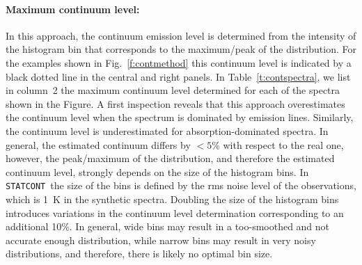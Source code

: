 \documentclass{aa}
\newcommand{\statcont} {\texttt{STATCONT}}
\begin{document}
\paragraph{\textbf{Maximum continuum level}:}
In this approach, the continuum emission level is determined from the intensity of the histogram bin that corresponds to the maximum/peak of the distribution. For the examples shown in Fig.~\ref{f:contmethod} this continuum level is indicated by a black dotted line in the central and right panels. In Table~\ref{t:contspectra}, we list in column~2 the maximum continuum level determined for each of the spectra shown in the Figure. A first inspection reveals that this approach overestimates the continuum level when the spectrum is dominated by emission lines. Similarly, the continuum level is underestimated for absorption-dominated spectra. In general, the estimated continuum differs by $<5$\% with respect to the real one, however, the peak/maximum of the distribution, and therefore the estimated continuum level, strongly depends on the size of the histogram bins. In \statcont\ the size of the bins is defined by the rms noise level of the observations, which is 1~K in the synthetic spectra. Doubling the size of the histogram bins introduces variations in the continuum level determination corresponding to an additional 10\%. In general, wide bins may result in a too-smoothed and not accurate enough distribution, while narrow bins may result in very noisy distributions, and therefore, there is likely no optimal bin size.
\end{document}
